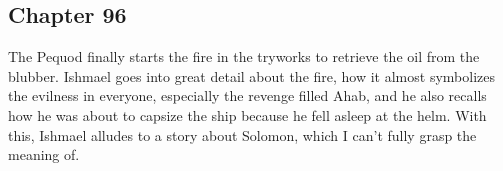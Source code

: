 \subsection{Chapter 96}

The Pequod finally starts the fire in the tryworks to retrieve the oil from the
blubber. Ishmael goes into great detail about the fire, how it almost
symbolizes the evilness in everyone, especially the revenge filled Ahab, and he
also recalls how he was about to capsize the ship because he fell asleep at the
helm. With this, Ishmael alludes to a story about Solomon, which I can't fully
grasp the meaning of.
